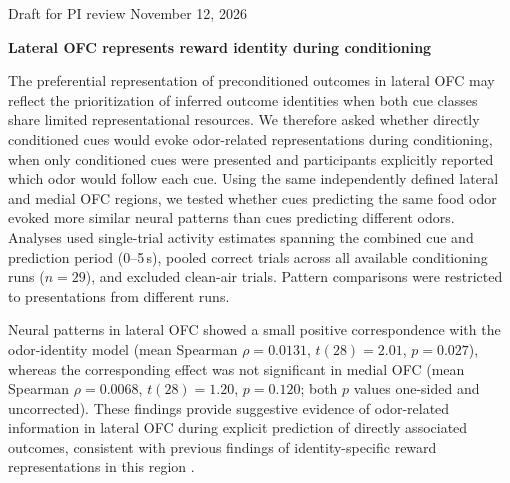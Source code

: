 \documentclass[11pt,letterpaper]{article}
\begin{document}
{\small\sffamily Draft for PI review \hfill November 12, 2026\par}
\vspace{0.4\baselineskip}
{\Large\bfseries Lateral OFC represents reward identity during conditioning\par}
\vspace{0.4\baselineskip}

The preferential representation of preconditioned outcomes in lateral OFC may reflect the prioritization of inferred outcome identities when both cue classes share limited representational resources. We therefore asked whether directly conditioned cues would evoke odor-related representations during conditioning, when only conditioned cues were presented and participants explicitly reported which odor would follow each cue. Using the same independently defined lateral and medial OFC regions, we tested whether cues predicting the same food odor evoked more similar neural patterns than cues predicting different odors. Analyses used single-trial activity estimates spanning the combined cue and prediction period (0--5\,s), pooled correct trials across all available conditioning runs ($n = 29$), and excluded clean-air trials. Pattern comparisons were restricted to presentations from different runs.

Neural patterns in lateral OFC showed a small positive correspondence with the odor-identity model (mean Spearman $\rho = 0.0131$, $t(28) = 2.01$, $p = 0.027$), whereas the corresponding effect was not significant in medial OFC (mean Spearman $\rho = 0.0068$, $t(28) = 1.20$, $p = 0.120$; both $p$ values one-sided and uncorrected). These findings provide suggestive evidence of odor-related information in lateral OFC during explicit prediction of directly associated outcomes, consistent with previous findings of identity-specific reward representations in this region \citep{howard2015identity,howard2017identity}.

{\small


}
\end{document}
